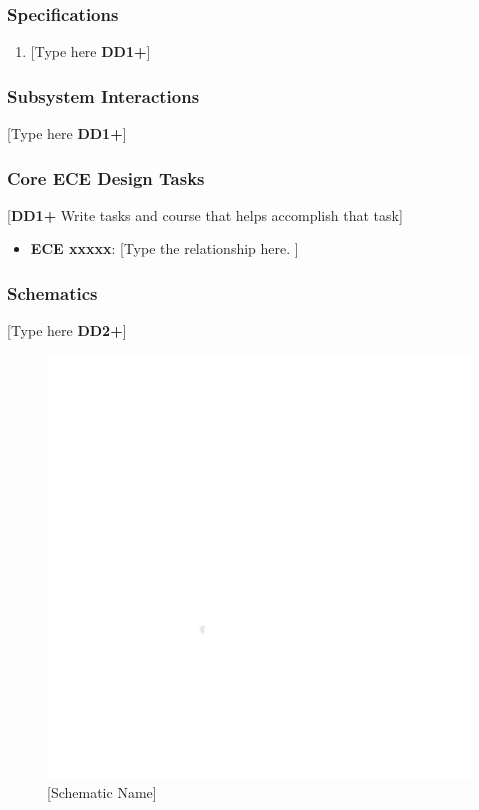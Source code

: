 \documentclass[letterpaper, 11pt]{article}
\begin{document}
\subsubsection{Specifications}
\begin{enumerate}
    \item {[Type here \textbf{DD1+}]}
\end{enumerate}

\subsubsection{Subsystem Interactions}
[Type here \textbf{DD1+}]

\subsubsection{Core ECE Design Tasks}
[\textbf{DD1+} Write tasks and course that helps accomplish that task]
\begin{itemize}
    \item \textbf{ECE xxxxx}: [Type the relationship here. ]
\end{itemize}

\subsubsection{Schematics}
[Type here \textbf{DD2+}]
\begin{figure}[h]
    \centering
    \includegraphics[width=16cm]{images/white.png} %
    \caption{[Schematic Name]}
\end{figure} %
\end{document}
